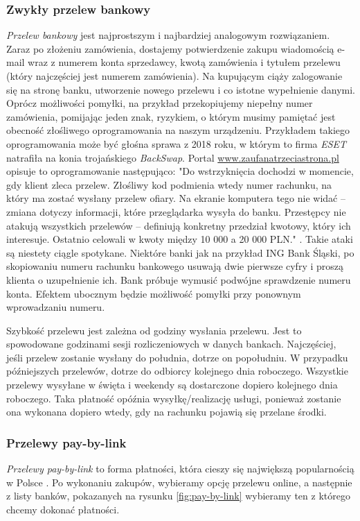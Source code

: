 \documentclass[12pt]{article}
\numberwithin{figure}{section}
\begin{document}
\begin{sloppypar}
\subsubsection{Zwykły przelew bankowy}
\textit{Przelew bankowy} jest najprostszym i najbardziej analogowym rozwiązaniem. Zaraz po złożeniu zamówienia, dostajemy potwierdzenie zakupu wiadomością e-mail wraz z numerem konta sprzedawcy, kwotą zamówienia i tytułem przelewu (który najczęściej jest numerem zamówienia). Na kupującym ciąży zalogowanie się na stronę banku, utworzenie nowego przelewu i co istotne wypełnienie danymi. Oprócz możliwości pomyłki, na przykład przekopiujemy niepełny numer zamówienia, pomijając jeden znak, ryzykiem, o którym musimy pamiętać jest obecność złośliwego oprogramowania na naszym urządzeniu. Przykładem takiego oprogramowania może być głośna sprawa z 2018 roku, w którym to firma \textit{ESET} natrafiła na konia trojańskiego \textit{BackSwap}. Portal \url{www.zaufanatrzeciastrona.pl} opisuje to oprogramowanie następująco: "Do wstrzyknięcia dochodzi w momencie, gdy klient zleca przelew. Złośliwy kod podmienia wtedy numer rachunku, na który ma zostać wysłany przelew ofiary. Na ekranie komputera tego nie widać – zmiana dotyczy informacji, które przeglądarka wysyła do banku. Przestępcy nie atakują wszystkich przelewów – definiują konkretny przedział kwotowy, który ich interesuje. Ostatnio celowali w kwoty między 10 000 a 20 000 PLN." \cite{backswap}.
Takie ataki są niestety ciągle spotykane. Niektóre banki jak na przykład ING Bank Śląski, po skopiowaniu numeru rachunku bankowego usuwają dwie pierwsze cyfry i proszą klienta o uzupełnienie ich. Bank próbuje wymusić podwójne sprawdzenie numeru konta. Efektem ubocznym będzie możliwość pomyłki przy ponownym wprowadzaniu numeru.

Szybkość przelewu jest zależna od godziny wysłania przelewu. Jest to spowodowane godzinami sesji rozliczeniowych w danych bankach. Najczęściej, jeśli przelew zostanie wysłany do południa, dotrze on popołudniu. W przypadku późniejszych przelewów, dotrze do odbiorcy kolejnego dnia roboczego. Wszystkie przelewy wysyłane w święta i weekendy są dostarczone dopiero kolejnego dnia roboczego. Taka płatność opóźnia wysyłkę/realizację usługi, ponieważ zostanie ona wykonana dopiero wtedy, gdy na rachunku pojawią się przelane środki. 

\subsubsection{Przelewy pay-by-link}
\textit{Przelewy pay-by-link} to forma płatności, która cieszy się największą popularnością w Polsce \cite{jak-placa-polacy}. Po wykonaniu zakupów, wybieramy opcję przelewu online, a następnie z listy banków, pokazanych na rysunku \ref{fig:pay-by-link} wybieramy ten z którego chcemy dokonać płatności. 


\end{sloppypar}
\end{document}
